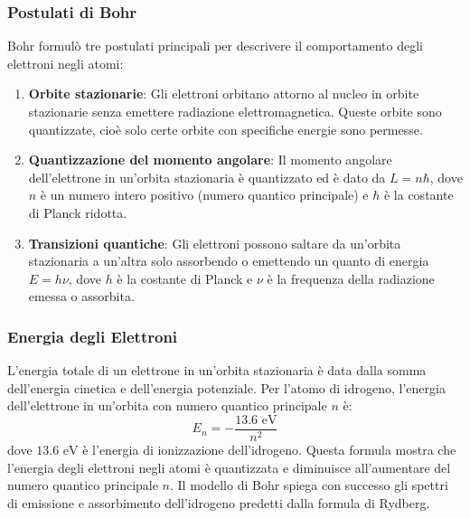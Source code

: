 \subsubsection*{Postulati di Bohr}
Bohr formulò tre postulati principali per descrivere il comportamento degli elettroni negli atomi:
\begin{enumerate}
    \item \textbf{Orbite stazionarie}: Gli elettroni orbitano attorno al nucleo in orbite stazionarie senza emettere radiazione elettromagnetica. Queste orbite sono quantizzate, cioè solo certe orbite con specifiche energie sono permesse.
    \item \textbf{Quantizzazione del momento angolare}: Il momento angolare dell'elettrone in un'orbita stazionaria è quantizzato ed è dato da \( L = n\hbar \), dove \( n \) è un numero intero positivo (numero quantico principale) e \( \hbar \) è la costante di Planck ridotta.
    \item \textbf{Transizioni quantiche}: Gli elettroni possono saltare da un'orbita stazionaria a un'altra solo assorbendo o emettendo un quanto di energia \( E = h\nu \), dove \( h \) è la costante di Planck e \( \nu \) è la frequenza della radiazione emessa o assorbita.
\end{enumerate}

\subsubsection*{Energia degli Elettroni}
L'energia totale di un elettrone in un'orbita stazionaria è data dalla somma dell'energia cinetica e dell'energia potenziale. Per l'atomo di idrogeno, l'energia dell'elettrone in un'orbita con numero quantico principale \( n \) è:
\[
E_n = - \frac{13.6 \text{ eV}}{n^2}
\]
dove \( 13.6 \text{ eV} \) è l'energia di ionizzazione dell'idrogeno. Questa formula mostra che l'energia degli elettroni negli atomi è quantizzata e diminuisce all'aumentare del numero quantico principale \( n \).
Il modello di Bohr spiega con successo gli spettri di emissione e assorbimento dell'idrogeno predetti dalla formula di Rydberg. 

